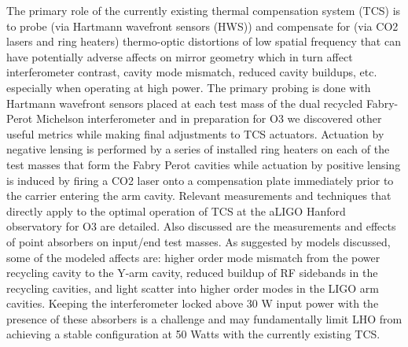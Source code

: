 
 The primary role of the currently existing thermal compensation system (TCS) is to probe (via Hartmann wavefront sensors (HWS)) and compensate for (via CO2 lasers and ring heaters) thermo-optic distortions of low spatial frequency that can have potentially adverse affects on mirror geometry which in turn affect interferometer contrast, cavity mode mismatch, reduced cavity buildups, etc. especially when operating at high power. The primary probing is done with Hartmann wavefront sensors placed at each test mass of the dual recycled Fabry-Perot Michelson interferometer and in preparation for O3 we discovered other useful metrics while making final adjustments to TCS actuators. Actuation by negative lensing is performed by a series of installed ring heaters on each of the test masses that form the Fabry Perot cavities while actuation by positive lensing is induced by firing a CO2 laser onto a compensation plate immediately prior to the carrier entering the arm cavity. Relevant measurements and techniques that directly apply to the optimal operation of TCS at the aLIGO Hanford observatory for O3 are detailed. Also discussed are the measurements and effects of point absorbers on input/end test masses. As suggested by models discussed, some of the modeled affects are: higher order mode mismatch from the power recycling cavity to the Y-arm cavity, reduced buildup of RF sidebands in the recycling cavities, and light scatter into higher order modes in the LIGO arm cavities. Keeping the interferometer locked above 30 W input power with the presence of these absorbers is a challenge and may fundamentally limit LHO from achieving a stable configuration at 50 Watts with the currently existing TCS. 